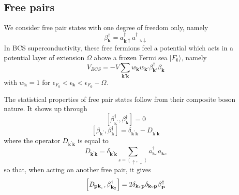 \documentclass[aps,prb,preprint,groupedaddress,amsmath]{revtex4-1}
\newcommand{\vp}{\ensuremath{\mathbf{p}}}
\newcommand{\vk}{\ensuremath{\mathbf{k}}}
\newcommand{\dg}{\ensuremath{\dagger}}
\begin{document}
\subsection{Free pairs}
We consider free pair states with one degree of freedom only, namely
\begin{equation}\label{eq:beta}
\beta_\vk^\dg=a^\dg_{\vk\uparrow}{}a^\dg_{-\vk\downarrow}
\end{equation}
 In BCS superconductivity, these free fermions feel a potential which acts in a potential layer of extension $\Omega$ above a frozen Fermi sea $|F_0{\rangle}$, namely
\begin{equation}
V_{BCS}=-V\sum_{\vk'\vk}w_{\vk}w_{\vk'}\beta^\dg_{\vk'}\beta^{}_\vk
\label{eq:}
\end{equation}
with $w_\vk=1$ for $\epsilon_{F_0}<\epsilon_\vk<\epsilon_{F_0}+\Omega$. 

The statistical properties of free pair states follow from their composite boson nature. It shows up through
\begin{equation}  
\left[\beta^{\dagger}_{\mathbf{k} ^{\prime}},\beta^{\dagger}_{\mathbf{k} }%
\right]  =0
\end{equation}
\begin{equation}  \label{eq:betacom}
\left[\beta_{\mathbf{k} ^{\prime}},\beta^{\dagger}_{\mathbf{k} }\right] 
=\delta_{\mathbf{k} ^{\prime}\mathbf{k} }-\mathit{D} _{\mathbf{k} ^{\prime}%
\mathbf{k} }
\end{equation}
where the operator $\mathit{D} _{\mathbf{k} ^{\prime}\mathbf{k} }$ is equal to
\begin{equation}\label{eq:D}
\mathit{D} _{\mathbf{k} ^{\prime}\mathbf{k} }=\delta_{\mathbf{k} ^{\prime}\mathbf{k}}\sum_{s=(\uparrow,\downarrow)}a^\dg_{\vk{s}}{}a^{}_{\vk{s}}
\end{equation}
 so that, when acting on another free pair, it gives
\begin{equation}
\left[\mathit{D} _{\mathbf{p}\mathbf{k} ^{}_1},\beta^{\dagger}_{%
\mathbf{k} _2}\right]  =2\delta_{\mathbf{k}_1 \mathbf{p} }\delta_{\mathbf{k}_2 \mathbf{p} }\beta_\vp^\dg
\end{equation}
\end{document}

